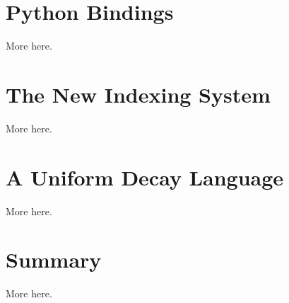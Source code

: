 \documentclass{webofc}
\begin{document}
\section{Python Bindings}
\label{sec-py}
More here.

\section{The New Indexing System}
\label{sec-ind}
More here.

\section{A Uniform Decay Language}
\label{sec-ampgen}
More here.


\section{Summary}
\label{sec-summary}
More here.


%
\end{document}

